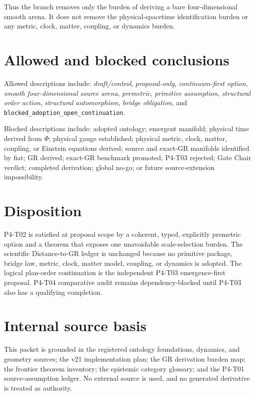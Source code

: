\documentclass[11pt]{article}
\begin{document}
Thus the branch removes only the burden of deriving a bare four-dimensional
smooth arena. It does not remove the physical-spacetime identification burden
or any metric, clock, matter, coupling, or dynamics burden.

\section{Allowed and blocked conclusions}

Allowed descriptions include: \emph{draft/control}, \emph{proposal-only},
\emph{continuum-first option}, \emph{smooth four-dimensional source arena},
\emph{premetric}, \emph{primitive assumption}, \emph{structural order
action}, \emph{structural automorphism}, \emph{bridge obligation}, and
\texttt{blocked\_adoption\_open\_continuation}.

Blocked descriptions include: adopted ontology; emergent manifold; physical
time derived from $\Phi$; physical gauge established; physical metric, clock,
matter, coupling, or Einstein equations derived; source and exact-GR manifolds
identified by fiat; GR derived; exact-GR benchmark promoted; P4-T03 rejected;
Gate Chair verdict; completed derivation; global no-go; or future
source-extension impossibility.

\section{Disposition}

P4-T02 is satisfied at proposal scope by a coherent, typed, explicitly
premetric option and a theorem that exposes one unavoidable scale-selection
burden. The scientific Distance-to-GR ledger is unchanged because no primitive
package, bridge law, metric, clock, matter model, coupling, or dynamics is
adopted. The logical plan-order continuation is the independent P4-T03
emergence-first proposal. P4-T04 comparative audit remains dependency-blocked
until P4-T03 also has a qualifying completion.

\section*{Internal source basis}

This packet is grounded in the registered ontology foundations, dynamics, and
geometry sources; the v21 implementation plan; the GR derivation burden map;
the frontier theorem inventory; the epistemic category glossary; and the
P4-T01 source-assumption ledger. No external source is used, and no generated
derivative is treated as authority.
\end{document}
